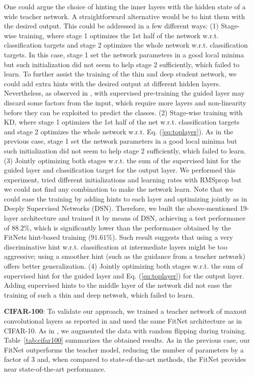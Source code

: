 \documentclass{article} %
\begin{document}
One could argue the choice of hinting the inner layers with the hidden state of a wide teacher network. A straightforward alternative would be to hint them with the desired output. This could be addressed in a few different ways: (1) Stage-wise training, where stage 1 optimizes the 1st half of the network w.r.t. classification targets and stage 2 optimizes the whole network w.r.t. classification targets. In this case, stage 1 set the network parameters in a good local minima but such initialization did not seem to help stage 2 sufficiently, which failed to learn. To further assist the training of the thin and deep student network, we could add extra hints with the desired output at different hidden layers. Nevertheless, as observed in \citep{Bengio07}, with supervised pre-training the guided layer may discard some factors from the input, which require
more layers and non-linearity before they can be exploited to predict the classes. (2) Stage-wise training with KD, where stage 1 optimizes the 1st half of the net w.r.t. classification targets and stage 2 optimizes the whole network w.r.t. Eq. (\ref{eq:toplayer}). As in the previous case, stage 1 set the network parameters in a good local minima but such initialization did not seem to help stage 2 sufficiently, which failed to learn. (3) Jointly optimizing both stages w.r.t. the sum of the supervised hint for the guided layer and classification target for the output layer. We performed this experiment, tried different initializations and learning rates with RMSprop \citep{Tieleman12} but we could not find any combination to make the network learn. Note that we could ease the training by adding hints to each layer and optimizing jointly as in Deeply Supervised Networks (DSN). Therefore, we built the above-mentioned 19-layer architecture and trained it by means of DSN, achieving a test performance of $88.2\%$, which is significantly lower than the performance obtained by the FitNets hint-based training ($91.61\%$). Such result suggests that using a very discriminative hint w.r.t. classification at intermediate layers might be too aggressive; using a smoother hint (such as the guidance from a teacher network) offers better generalization. (4) Jointly optimizing both stages w.r.t. the sum of supervised hint for the guided layer and Eq. (\ref{eq:toplayer}) for the output layer. Adding supervised hints to the middle layer of the network did not ease the training of such a thin and deep network, which failed to learn.

\textbf{CIFAR-100}: To validate our approach, we trained a teacher network of maxout convolutional layers as reported in \citet{Goodfellow13} and used the same FitNet architecture as in CIFAR-10. As in \citet{Lee14},  we augmented the data with random flipping during training. Table~\ref{tab:cifar100} summarizes the obtained results. As in the previous case, our FitNet outperforms the teacher model, 
reducing the number of parameters by a factor of 3 and, when compared to state-of-the-art methods, the FitNet provides near state-of-the-art performance.
\end{document}
